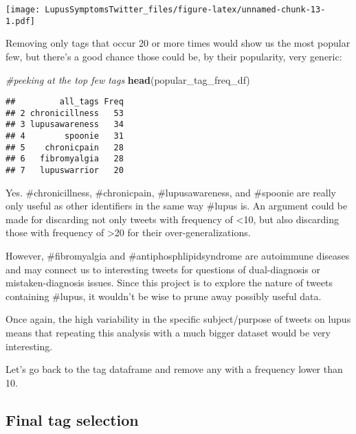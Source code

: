 \documentclass[]{article}
\newenvironment{Shaded}{\begin{snugshade}}{\end{snugshade}}
\newcommand{\CommentTok}[1]{\textcolor[rgb]{0.56,0.35,0.01}{\textit{#1}}}
\newcommand{\DecValTok}[1]{\textcolor[rgb]{0.00,0.00,0.81}{#1}}
\newcommand{\KeywordTok}[1]{\textcolor[rgb]{0.13,0.29,0.53}{\textbf{#1}}}
\newcommand{\NormalTok}[1]{#1}
\newcommand{\OperatorTok}[1]{\textcolor[rgb]{0.81,0.36,0.00}{\textbf{#1}}}
\newcommand{\StringTok}[1]{\textcolor[rgb]{0.31,0.60,0.02}{#1}}
\begin{document}
\texttt{[image: LupusSymptomsTwitter\_files/figure-latex/unnamed-chunk-13-1.pdf]}

Removing only tags that occur 20 or more times would show us the most
popular few, but there's a good chance those could be, by their
popularity, very generic:

\begin{Shaded}
\begin{Highlighting}[]
\CommentTok{#peeking at the top few tags}
\KeywordTok{head}\NormalTok{(popular_tag_freq_df)}
\end{Highlighting}
\end{Shaded}

\begin{verbatim}
##         all_tags Freq
## 2 chronicillness   53
## 3 lupusawareness   34
## 4        spoonie   31
## 5    chronicpain   28
## 6   fibromyalgia   28
## 7   lupuswarrior   20
\end{verbatim}

Yes. \#chronicillness, \#chronicpain, \#lupusawareness, and \#spoonie
are really only useful as other identifiers in the same way \#lupus is.
An argument could be made for discarding not only tweets with frequency
of \textless{}10, but also discarding those with frequency of
\textgreater{}20 for their over-generalizations.

However, \#fibromyalgia and \#antiphosphlipidsyndrome are autoimmune
diseases and may connect us to interesting tweets for questions of
dual-diagnosis or mistaken-diagnosis issues. Since this project is to
explore the nature of tweets containing \#lupus, it wouldn't be wise to
prune away possibly useful data.

Once again, the high variability in the specific subject/purpose of
tweets on lupus means that repeating this analysis with a much bigger
dataset would be very interesting.

Let's go back to the tag dataframe and remove any with a frequency lower
than 10.

\hypertarget{final-tag-selection}{%
\subsection{Final tag selection}\label{final-tag-selection}}

\begin{Shaded}
\end{Shaded}
\end{document}
